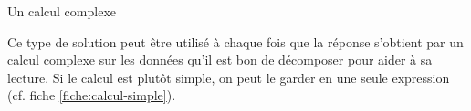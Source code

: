 \begin{Fiche}{Un calcul complexe}

	Ce type de solution peut être utilisé à chaque fois
	que la réponse s’obtient par un calcul complexe sur les données
	qu’il est bon de décomposer pour aider à sa lecture.
	Si le calcul est plutôt simple, 
	on peut le garder en une seule expression
	(cf. fiche \vref{fiche:calcul-simple}).
	
\end{Fiche}

